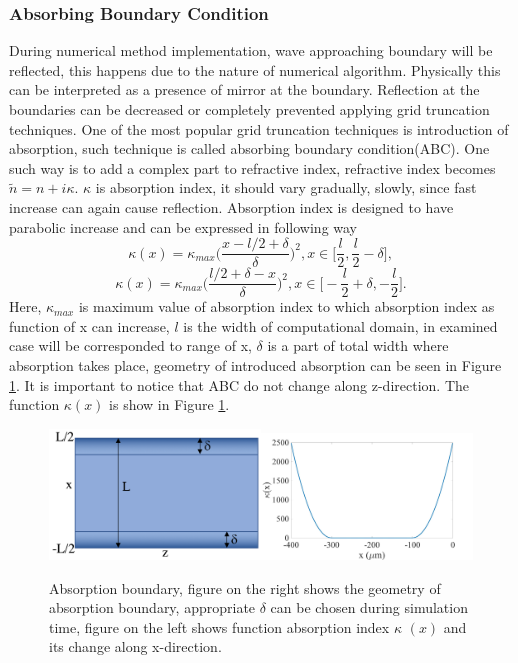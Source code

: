 \documentclass[a4paper]{article}
\begin{document}
	\subsubsection{Absorbing Boundary Condition}
	During numerical method implementation, wave approaching boundary will be reflected, this happens due to the nature of numerical algorithm. Physically this can be interpreted as a presence of mirror at the boundary. Reflection at the boundaries can be decreased or completely prevented applying grid truncation techniques. One of the most popular grid truncation techniques is introduction of absorption, such technique is called absorbing boundary condition(ABC). One such way is to add a complex part to refractive index, refractive index becomes $\tilde{n} = n+i\kappa$. $\kappa$  is absorption index, it should vary gradually, slowly, since fast increase can again cause reflection. Absorption index is designed to have parabolic increase and can be expressed in following way
	\[\kappa(x)=\kappa_{max}\bigg(\frac{x-l/2+\delta}{\delta}\bigg)^2, x\in \bigg[\frac{l}{2},\frac{l}{2}-\delta\bigg],\]
	\[\kappa(x)=\kappa_{max}\bigg(\frac{l/2+\delta-x}{\delta}\bigg)^2, x\in \bigg[-\frac{l}{2}+\delta,-\frac{l}{2}\bigg].\]
	Here, $\kappa_{max}$ is maximum value of absorption index to which absorption index as function of x can increase, $l$ is the width of computational domain, in examined case will be corresponded to range of x, $\delta$ is a part of total width where absorption takes place, geometry of introduced absorption can be seen in Figure \ref{fig:Absorption}. It is important to notice that ABC do not change along z-direction. The function $\kappa (x)$ is show in Figure \ref{fig:Absorption}\cite{pedrola2015beam}.
	\begin{figure}[h!]
		\centering 
		\includegraphics[width=0.5\textwidth]{sketchN1.png}\includegraphics[width=0.5\textwidth]{N2.jpg}
		\caption{\label{fig:Absorption}Absorption boundary, figure on the right shows the geometry of absorption boundary, appropriate $\delta$ can be chosen during simulation time, figure on the left shows function absorption index $\kappa$ $ (x) $ and its change along x-direction.}
	\end{figure}
\end{document}

